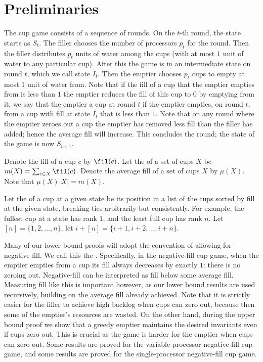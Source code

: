 \section{Preliminaries}\label{sec:prelims}
The cup game consists of a sequence of rounds. On the $t$-th
round, the state starts as $S_t$. The filler chooses the number
of processors $p_t$ for the round. Then the filler distributes
$p_t$ units of water among the cups (with at most $1$ unit of
water to any particular cup). After this the game is in an
intermediate state on round $t$, which we call state $I_t$. Then
the emptier chooses $p_t$ cups to empty at most $1$ unit of water
from. Note that if the fill of a cup that the emptier empties
from is less than $1$ the emptier reduces the fill of this cup to
$0$ by emptying from it; we say that the emptier  a cup at round $t$ if the emptier empties, on round $t$,
from a cup with fill at state $I_t$ that is less than $1$. Note
that on any round where the emptier zeroes out a cup the emptier
has removed less fill than the filler has added; hence the
average fill will increase. This concludes the round; the state
of the game is now $S_{t+1}$.

Denote the fill of a cup $c$ by $\fil(c)$. Let the  of
a set of cups $X$ be $m(X) = \sum_{c\in X} \fil(c)$. Denote the
average fill of a set of cups $X$ by $\mu(X)$. Note that $\mu(X)
|X| = m(X)$.

Let the  of a cup at a given state be its position in
a list of the cups sorted by fill at the given state, breaking
ties arbitrarily but consistently. For example, the fullest cup
at a state has rank $1$, and the least full cup has rank $n$. Let
$[n] = \{1,2,\ldots, n\}$, let $i+[n] = \{i+1, i+2, \ldots,
i+n\}$.

Many of our lower bound proofs will adopt the convention of
allowing for negative fill. We call this the . Specifically, in the negative-fill cup game, when the
emptier empties from a cup its fill always decreases by exactly
$1$: there is no zeroing out. Negative-fill can be interpreted as
fill below some average fill. Measuring fill like this is
important however, as our lower bound results are used
recursively, building on the average fill already achieved. Note
that it is strictly easier for the filler to achieve high backlog
when cups can zero out, because then some of the emptier's
resources are wasted. On the other hand, during the upper bound
proof we show that a greedy emptier maintains the desired
invariants even if cups zero out. This is crucial as the game is
harder for the emptier when cups can zero out. Some results are
proved for the variable-processor negative-fill cup game, and
some results are proved for the single-processor negative-fill
cup game.

